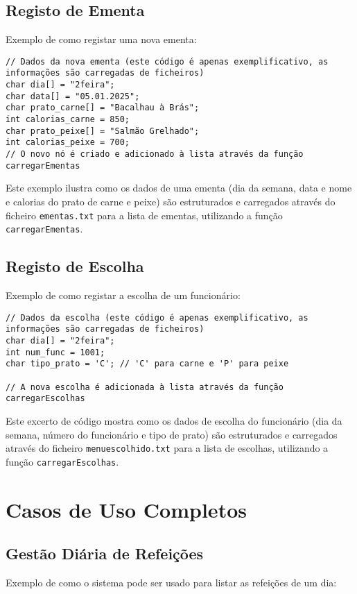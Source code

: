 \documentclass[a4paper,12pt]{report}
\begin{document}
\subsection{Registo de Ementa}
Exemplo de como registar uma nova ementa:

\begin{lstlisting}[caption={Exemplo de registo de ementa},label=lst:exemplo_ementa_reg]
// Dados da nova ementa (este código é apenas exemplificativo, as informações são carregadas de ficheiros)
char dia[] = "2feira";
char data[] = "05.01.2025";
char prato_carne[] = "Bacalhau à Brás";
int calorias_carne = 850;
char prato_peixe[] = "Salmão Grelhado";
int calorias_peixe = 700;
// O novo nó é criado e adicionado à lista através da função carregarEmentas
\end{lstlisting}
Este exemplo ilustra como os dados de uma ementa (dia da semana, data e nome e calorias do prato de carne e peixe) são estruturados e carregados através do ficheiro \texttt{ementas.txt} para a lista de ementas, utilizando a função \texttt{carregarEmentas}.

\subsection{Registo de Escolha}
Exemplo de como registar a escolha de um funcionário:

\begin{lstlisting}[caption={Exemplo de registo de escolha},label=lst:exemplo_escolha_reg]
// Dados da escolha (este código é apenas exemplificativo, as informações são carregadas de ficheiros)
char dia[] = "2feira";
int num_func = 1001;
char tipo_prato = 'C'; // 'C' para carne e 'P' para peixe

// A nova escolha é adicionada à lista através da função carregarEscolhas
\end{lstlisting}
Este excerto de código mostra como os dados de escolha do funcionário (dia da semana, número do funcionário e tipo de prato) são estruturados e carregados através do ficheiro \texttt{menu\textunderscore escolhido.txt} para a lista de escolhas, utilizando a função \texttt{carregarEscolhas}.

\section{Casos de Uso Completos}
\subsection{Gestão Diária de Refeições}
Exemplo de como o sistema pode ser usado para listar as refeições de um dia:
\end{document}
